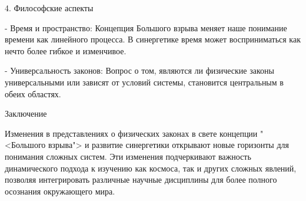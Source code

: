 \documentclass[exam_answers.tex]{subfiles}
\begin{document}
4. Философские аспекты

- Время и пространство: Концепция Большого взрыва меняет наше понимание времени как линейного процесса. В синергетике время может восприниматься как нечто более гибкое и изменчивое.

- Универсальность законов: Вопрос о том, являются ли физические законы универсальными или зависят от условий системы, становится центральным в обеих областях.

Заключение

Изменения в представлениях о физических законах в свете концепции "<Большого взрыва"> и развитие синергетики открывают новые горизонты для понимания сложных систем. Эти изменения подчеркивают важность динамического подхода к изучению как космоса, так и других сложных явлений, позволяя интегрировать различные научные дисциплины для более полного осознания окружающего мира.
\end{document}
